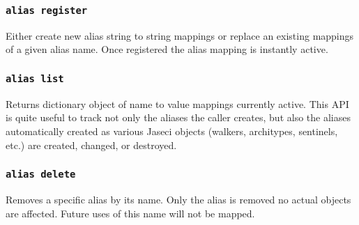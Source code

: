\subsubsection{\lstinline[basicstyle=\Large\ttfamily]$alias register$}

{Either create new alias string to string mappings or replace
an existing mappings of a given alias name. Once registered the
alias mapping is instantly active.\vspace{4mm}\par
{}\vspace{4mm}\par
{}}
\subsubsection{\lstinline[basicstyle=\Large\ttfamily]$alias list$}

{Returns dictionary object of name to value mappings currently active.
This API is quite useful to track not only the aliases the caller
creates, but also the aliases automatically created as various Jaseci
objects (walkers, architypes, sentinels, etc.) are created, changed,
or destroyed.\vspace{4mm}\par
{}}
\subsubsection{\lstinline[basicstyle=\Large\ttfamily]$alias delete$}

{Removes a specific alias by its name. Only the alias is removed no
actual objects are affected. Future uses of this name will not be
mapped.\vspace{4mm}\par
{}\vspace{4mm}\par
{}}
